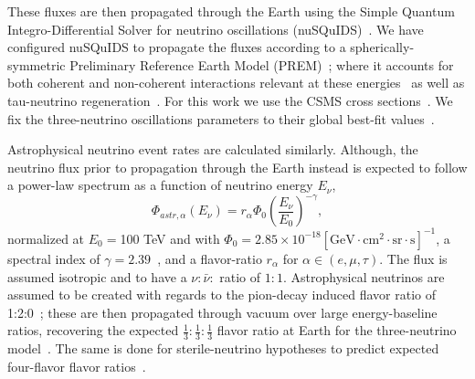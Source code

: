 \documentclass[main.tex]{subfiles}
\begin{document}
These fluxes are then propagated through the Earth using the Simple Quantum Integro-Differential Solver for neutrino oscillations (nuSQuIDS)~\cite{Delgado:2014kpa,arguelles:2015nu,arguelles2021nusquids}. 
We have configured nuSQuIDS to propagate the fluxes according to a spherically-symmetric Preliminary Reference Earth Model (PREM)~\cite{DZIEWONSKI1981297}; where it accounts for both coherent and non-coherent interactions relevant at these energies~\cite{Gonzalez_Garcia_2005, PhysRev.118.316} as well as tau-neutrino regeneration~\cite{PhysRevLett.81.4305}. 
For this work we use the CSMS cross sections~\cite{CooperSarkar:2011pa}. We fix the three-neutrino oscillations parameters to their global best-fit values~\cite{nufit2020}.


Astrophysical neutrino event rates are calculated similarly. Although, the neutrino flux prior to propagation through the Earth instead is expected to follow a power-law spectrum as a function of neutrino energy $E_{\nu}$, 
\begin{equation}
\Phi_{astr,\alpha}(E_{\nu}) = r_{\alpha}\Phi_{0}\left(\dfrac{E_{\nu}}{E_{0}}\right)^{-\gamma},
\end{equation}
normalized at $E_{0}=$100 TeV and with $\Phi_{0}=2.85\times 10^{-18}[\text{GeV}\cdot\text{cm}^{2}\cdot\text{sr}\cdot\text{s}]^{-1}$, a spectral index of $\gamma=2.39$~\cite{Aartsen_2020_prd}, and a flavor-ratio $r_{\alpha}$ for $\alpha\in( e,\mu,\tau)$. The flux is assumed isotropic and to have a $\nu:\bar{\nu}:$ ratio of $1:1$. 
Astrophysical neutrinos are assumed to be created with regards to the pion-decay induced flavor ratio of 1:2:0~\cite{PhysRevD.68.093005,ATHAR_2006}; these are then propagated through vacuum over large energy-baseline ratios, recovering the expected $\tfrac{1}{3}:\tfrac{1}{3}:\tfrac{1}{3}$ flavor ratio at Earth for the three-neutrino model~\cite{Aartsen_2015}.  
The same is done for sterile-neutrino hypotheses to predict expected four-flavor flavor ratios~\cite{carlos2020}. 
\end{document}
